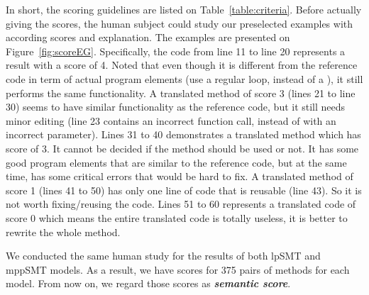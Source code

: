 In short, the scoring guidelines are listed on
Table~\ref{table:criteria}. Before actually giving the scores, the
human subject could study our preselected examples with according
scores and explanation. The examples are presented on
Figure~\ref{fig:scoreEG}. Specifically, the code from line 11 to line
20 represents a result with a score of 4. Noted that even though it is
different from the reference code in term of actual program elements
(use a regular  loop, instead of a ), it still
performs the same functionality. A translated method of score 3 (lines
21 to line 30) seems to have similar functionality as the reference
code, but it still needs minor editing (line 23 contains an incorrect
function call,  instead of  with an
incorrect parameter). Lines 31 to 40 demonstrates a translated method
which has score of 3. It cannot be decided if the method should be
used or not. It has some good program elements that are similar to the
reference code, but at the same time, has some critical errors that
would be hard to fix. A translated method of score 1 (lines 41 to 50)
has only one line of code that is reusable (line 43). So it is not
worth fixing/reusing the code. Lines 51 to 60 represents a translated
code of score 0 which means the entire translated code is totally
useless, \ie it is better to rewrite the whole method.


We conducted the same human study for the results of both lpSMT and mppSMT models. As a result, we have scores for 375 pairs of methods for each model. From now on, we regard those scores as \textbf{{\em semantic score}}.

